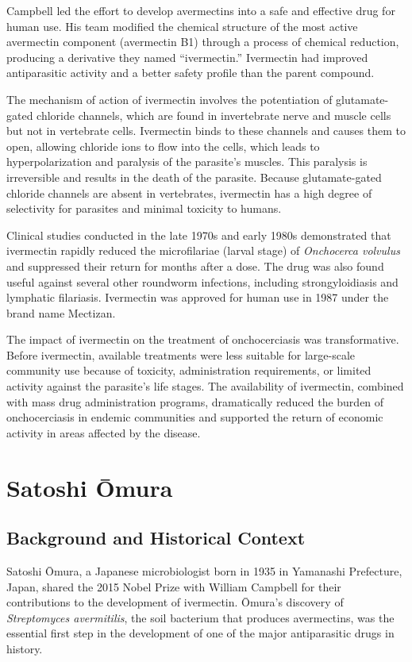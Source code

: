 Campbell led the effort to develop avermectins into a safe and effective drug for human use. His team modified the chemical structure of the most active avermectin component (avermectin B1) through a process of chemical reduction, producing a derivative they named ``ivermectin.'' Ivermectin had improved antiparasitic activity and a better safety profile than the parent compound.

The mechanism of action of ivermectin involves the potentiation of glutamate-gated chloride channels, which are found in invertebrate nerve and muscle cells but not in vertebrate cells. Ivermectin binds to these channels and causes them to open, allowing chloride ions to flow into the cells, which leads to hyperpolarization and paralysis of the parasite's muscles. This paralysis is irreversible and results in the death of the parasite. Because glutamate-gated chloride channels are absent in vertebrates, ivermectin has a high degree of selectivity for parasites and minimal toxicity to humans.

Clinical studies conducted in the late 1970s and early 1980s demonstrated that ivermectin rapidly reduced the microfilariae (larval stage) of \textit{Onchocerca volvulus} and suppressed their return for months after a dose. The drug was also found useful against several other roundworm infections, including strongyloidiasis and lymphatic filariasis. Ivermectin was approved for human use in 1987 under the brand name Mectizan.

The impact of ivermectin on the treatment of onchocerciasis was transformative. Before ivermectin, available treatments were less suitable for large-scale community use because of toxicity, administration requirements, or limited activity against the parasite's life stages. The availability of ivermectin, combined with mass drug administration programs, dramatically reduced the burden of onchocerciasis in endemic communities and supported the return of economic activity in areas affected by the disease.

\section{Satoshi \=Omura}

\subsection{Background and Historical Context}

Satoshi \=Omura, a Japanese microbiologist born in 1935 in Yamanashi Prefecture, Japan, shared the 2015 Nobel Prize with William Campbell for their contributions to the development of ivermectin. \=Omura's discovery of \textit{Streptomyces avermitilis}, the soil bacterium that produces avermectins, was the essential first step in the development of one of the major antiparasitic drugs in history.

